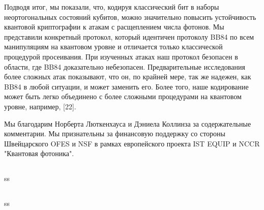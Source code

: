 Подводя итог, мы показали, что, кодируя классический бит в наборы неортогональных состояний кубитов, можно значительно повысить устойчивость квантовой криптографии к атакам с расщеплением числа фотонов. Мы представили конкретный протокол, который идентичен протоколу BB84 по всем манипуляциям на квантовом уровне и отличается только классической процедурой просеивания. При изученных атаках наш протокол безопасен в области, где BB84 доказательно небезопасен. Предварительные исследования более сложных атак показывают, что он, по крайней мере, так же надежен, как BB84 в любой ситуации, и может заменить его. Более того, наше кодирование может быть легко объединено с более сложными процедурами на квантовом уровне, например, [22].

Мы благодарим Норберта Люткенхауса и Дэниела Коллинза за содержательные комментарии. Мы признательны за финансовую поддержку со стороны Швейцарского OFES и NSF в рамках европейского проекта IST EQUIP и NCCR "Квантовая фотоника".
\subsection{\review}
ss
\subsection{\dic}
ss